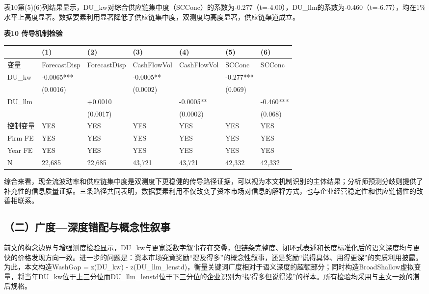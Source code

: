 表10第(5)(6)列结果显示，DU\_kw对综合供应链集中度（SCConc）的系数为-0.277（t=-4.00），DU\_llm的系数为-0.460（t=-6.77），均在1\%水平上高度显著。数据要素利用显著降低了供应链集中度，双测度均高度显著，供应链渠道成立。

\textbf{表10 传导机制检验}

{\def\LTcaptype{} %
\begin{longtable}[]{@{}lllllll@{}}
\toprule\noalign{}
& (1) & (2) & (3) & (4) & (5) & (6) \\
\midrule\noalign{}
\endhead
\bottomrule\noalign{}
\endlastfoot
变量 & ForecastDisp & ForecastDisp & CashFlowVol & CashFlowVol & SCConc & SCConc \\
DU\_kw & -0.0065*** & & -0.0005** & & -0.277*** & \\
& (0.0016) & & (0.0002) & & (0.069) & \\
DU\_llm & & +0.0010 & & -0.0005** & & -0.460*** \\
& & (0.0017) & & (0.0002) & & (0.068) \\
控制变量 & YES & YES & YES & YES & YES & YES \\
Firm FE & YES & YES & YES & YES & YES & YES \\
Year FE & YES & YES & YES & YES & YES & YES \\
N & 22,685 & 22,685 & 43,721 & 43,721 & 42,332 & 42,332 \\
\end{longtable}
}

综合来看，现金流波动率和供应链集中度是双测度下更稳健的传导路径证据，可以视为本文机制识别的主体结果；分析师预测分歧则提供了补充性的信息质量证据。三条路径共同表明，数据要素利用不仅改变了资本市场对信息的解释方式，也与企业经营稳定性和供应链韧性的改善相联系。

\subsection{（二）广度---深度错配与概念性叙事}\label{ux4e8cux5e7fux5ea6ux6df1ux5ea6ux9519ux914dux4e0eux6982ux5ff5ux6027ux53d9ux4e8b}

前文的构念边界与增强测度检验显示，DU\_kw与更宽泛数字叙事存在交叠，但链条完整度、闭环式表述和长度标准化后的语义深度均与更快的价格发现方向一致。进一步的问题是：资本市场究竟奖励``提及得多''的概念性叙事，还是奖励``说得具体、用得更深''的实质利用披露。为此，本文构造WashGap = z(DU\_kw) - z(DU\_llm\_lenstd)，衡量关键词广度相对于语义深度的超额部分；同时构造BroadShallow虚拟变量，将当年DU\_kw位于上三分位而DU\_llm\_lenstd位于下三分位的企业识别为``提得多但说得浅''的样本。所有检验均采用与主文一致的滞后规格。

